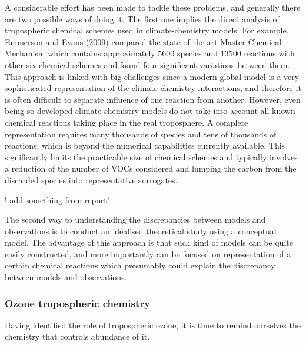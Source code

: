 \documentclass[11pt,a4paper]{article}
\begin{document}
A considerable effort has been made to tackle these problems, and generally there are two possible ways of doing it. The first one implies the direct analysis of tropospheric chemical schemes used in climate-chemistry models. For example, Emmerson and Evans (2009) compared the state of the art Master Chemical Mechanism which contains approximately 5600 species and 13500 reactions \citep{Jenkin2002} with other six chemical schemes and found four significant variations between them. This approach is linked with big challenges since a modern global model is a very sophisticated representation of the climate-chemistry interactions, and therefore it is often difficult to separate influence of one reaction from another. However, even being so developed climate-chemistry models do not take into account all known chemical reactions taking place in the real troposphere. A complete representation requires many thousands of species and tens of thousands of reactions, which is beyond the numerical capabilities currently available. This significantly limits the practicable size of chemical schemes and typically involves a reduction of the number of VOCs considered and lumping the carbon from the discarded species into representative surrogates.

! add something from report!

The second way to understanding the discrepancies between models and observations is to conduct an idealised theoretical study using a conceptual model. The advantage of this approach is that such kind of models can be quite easily constructed, and more importantly can be focused on representation of a certain chemical reactions which presumably could explain the discrepancy between models and observations.

\subsubsection*{Ozone tropospheric chemistry}\label{intro_O3chem}
%
Having identified the role of tropospheric ozone, it is time to remind ourselves the chemistry that controls abundance of it.
\end{document}
